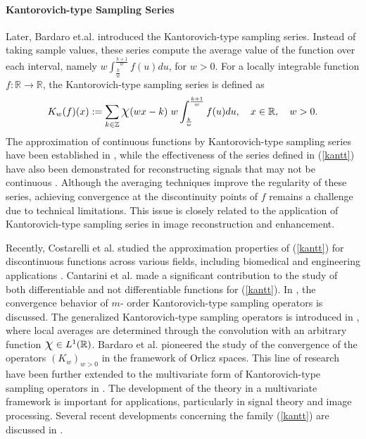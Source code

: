 \documentclass[11pt, a4paper]{article}
\theoremstyle{definition}
\numberwithin{equation}{section}
\def\ZZ{\mathbb Z}
\def\RR{\mathbb R}
\def\Chi{\mbox{\Large$\chi$}}
\begin{document}
\paragraph{Kantorovich-type Sampling Series} Later,  Bardaro et.al. \cite{bardaro10} introduced the Kantorovich-type sampling series. Instead of taking sample values, these series compute the average value of the function over each interval, namely $w \int_{\frac{k}{w}}^{\frac{k+1}{w}}f(u)du$, for $w>0$. For  a locally integrable function $f:\RR \rightarrow \RR$, the Kantorovich-type sampling series is defined as
\begin{equation}\label{kantt}
    K_{w}(f)({x}) :=\sum_{{k}\in \ZZ} \Chi(w{x}-{k})\hspace{3pt} w \int_{\frac{k}{w}}^{\frac{k+1}{w}}f(u)du, \quad  x \in \RR, \quad w>0 .
\end{equation} 
The approximation of continuous functions by Kantorovich-type sampling series have been established in \cite{bardaro10, multi}, while the effectiveness of the series defined in (\ref{kantt}) have also been demonstrated for reconstructing signals that may not be continuous \cite{orlova}.
Although the averaging techniques improve the regularity of these series, achieving convergence at the discontinuity points of $f$ remains a challenge due to technical limitations. This issue is closely related to the application of Kantorovich-type sampling series in image reconstruction and enhancement.

Recently, Costarelli et al. \cite{disc} studied the approximation properties of (\ref{kantt}) for discontinuous functions across various fields, including biomedical and engineering applications \cite{cagini, civil}.
Cantarini et al. \cite{diff} made a significant contribution to the study of both differentiable and not differentiable functions for (\ref{kantt}). In \cite{morder}, the convergence behavior of $m$- order Kantorovich-type sampling operators is discussed. The generalized Kantorovich-type sampling operators is introduced in \cite{orlova},
where local averages are determined through the convolution
with an arbitrary function $\Chi \in L^1(\RR)$.  Bardaro et al. \cite{bardaro10} pioneered the study of the convergence of the operators $(K_{w})_{w>0}$ in the framework of Orlicz spaces. This line of research have been further extended to the multivariate form of Kantorovich-type sampling operators in \cite{multi}. The development of the theory in a multivariate framework is important for applications, particularly in signal theory and image processing.
Several recent developments concerning the family (\ref{kantt}) are discussed in \cite{bardaro10, diff, disc, multi, orlova}.
\end{document}

